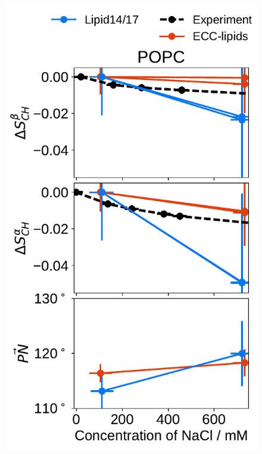  
\begin{figure}[tbp!] 
  \centering 
  \includegraphics[width=\figwidthsmall]{../img/ecc_pops/order_parameters_changes_ecc-lip_L14_A-B-PN-COO_POPC_nacl.pdf} 

\end{figure}
